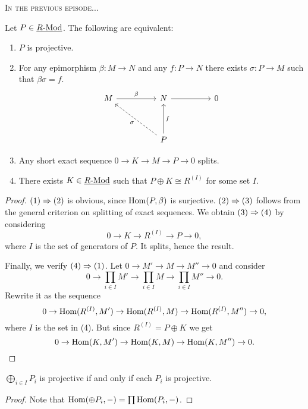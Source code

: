 
\textsc{In the previous episode...}

\begin{theorem*}
	Let \( P \in \underline{R\text{-}\mathrm{Mod}} \). The following are equivalent:
	\begin{enumerate}
		\item \( P \) is projective.
		\item For any epimorphism \( \beta: M \to N \) and any \( f: P \to N \) there exists \( \sigma: P \to M \) such that \( \beta \sigma = f \).
			  \[
				  \begin{tikzcd}
					  M && N && 0 \\
					  \\
					  && P
					  \arrow["\beta", from=1-1, to=1-3]
					  \arrow[from=1-3, to=1-5]
					  \arrow["\sigma", dashed, from=3-3, to=1-1]
					  \arrow["f"', from=3-3, to=1-3]
				  \end{tikzcd}
			  \]
		\item Any short exact sequence \( 0 \to K \to M \to P \to 0 \) splits.
		\item There exists \( K \in \underline{R\text{-}\mathrm{Mod}} \) such that \( P \oplus K \cong R^{(I)} \) for some set \( I \).
	\end{enumerate}
\end{theorem*}
\begin{proof}
	\( (1) \Rightarrow (2) \) is obvious, since \( \operatorname{Hom}(P, \beta) \) is surjective. \( (2) \Rightarrow (3) \) follows from the general criterion on splitting of exact sequences. We obtain \( (3) \Rightarrow (4) \) by considering
	\[0 \to K \to R^{(I)} \to P \to 0,\]
	where \( I \) is the set of generators of \( P \). It splits, hence the result.

	\vspace*{2mm}

	Finally, we verify \( (4) \Rightarrow (1) \). Let \( 0 \to M' \to M \to M'' \to 0 \) and consider
	\[0 \to \prod_{i \in I} M' \to \prod_{i \in I} M \to \prod_{i \in I} M'' \to 0.\]
	Rewrite it as the sequence
	\[0 \to \operatorname{Hom}(R^{(I)}, M') \to \operatorname{Hom}(R^{(I)}, M) \to \operatorname{Hom}(R^{(I)}, M'') \to 0,\]
	where \( I \) is the set in (4). But since \( R^{(I)} = P \oplus K \) we get
	\[0 \to \operatorname{Hom}(K, M') \to \operatorname{Hom}(K, M) \to \operatorname{Hom}(K, M'') \to 0.\]
\end{proof}

\begin{proposition*}
	\( \bigoplus\limits_{i \in I} P_i \) is projective if and only if each \( P_i \) is projective.
\end{proposition*}
\begin{proof}
	Note that \( \operatorname{Hom}(\oplus P_i, -) = \prod \operatorname{Hom}(P_i, -) \).
\end{proof}

